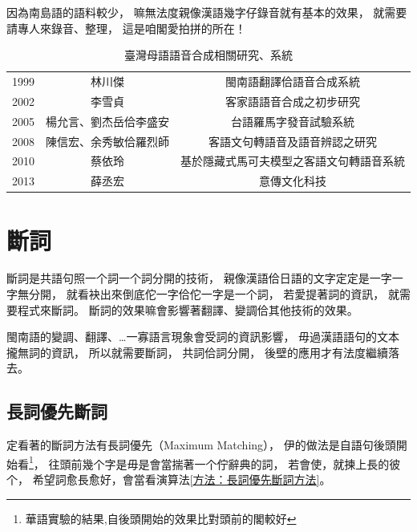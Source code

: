 因為南島語的語料較少，
嘛無法度親像漢語幾字仔錄音就有基本的效果，
就需要請專人來錄音、整理，
這是咱閣愛拍拼的所在！

\begin{table}
\caption{臺灣母語語音合成相關研究、系統}
\label{表：語音合成研究、系統}
\centering
\begin{tabular}{ccc}
1999 & 林川傑 & 閩南語翻譯佮語音合成系統\cite{中文到閩南語之線上翻譯及閩南語之語音合成} \\
2002 & 李雪貞 & 客家語語音合成之初步研究\cite{李雪貞2002客家語語音合成之初步研究} \\
2005 & 楊允言、劉杰岳佮李盛安 & 台語羅馬字發音試驗系統\cite{楊允言_台語羅馬字發音試驗系統} \\
2008 & 陳信宏、余秀敏佮羅烈師 & 客語文句轉語音及語音辨認之研究\cite{陳信宏2008客語文句轉語音及語音辨認之研究} \\
2010 & 蔡依玲 & 基於隱藏式馬可夫模型之客語文句轉語音系統\cite{蔡依玲2010基於隱藏式馬可夫模型之客語文句轉語音系統} \\
2013 & 薛丞宏 & 意傳文化科技\cite{意傳文化科技}
\end{tabular}
\end{table}

\section{斷詞}
\label{節：斷詞}
斷詞是共語句照一个詞一个詞分開的技術，
親像漢語佮日語的文字定定是一字一字無分開，
就看袂出來倒底佗一字佮佗一字是一个詞，
若愛提著詞的資訊，
就需要程式來斷詞。
斷詞的效果嘛會影響著翻譯、變調佮其他技術的效果。

閩南語的變調、翻譯、…一寡語言現象會受詞的資訊影響，
毋過漢語語句的文本攏無詞的資訊，
所以就需要斷詞，
共詞佮詞分開，
後壁的應用才有法度繼續落去。




\subsection{長詞優先斷詞}
\label{節：長詞優先斷詞}

定看著的斷詞方法有長詞優先（Maximum Matching），
伊的做法是自語句後頭開始看\footnote{華語實驗的結果,自後頭開始的效果比對頭前的閣較好}，
往頭前幾个字是毋是會當揣著一个佇辭典的詞，
若會使，就揀上長的彼个，
希望詞愈長愈好，會當看演算法\ref{方法：長詞優先斷詞方法}。

